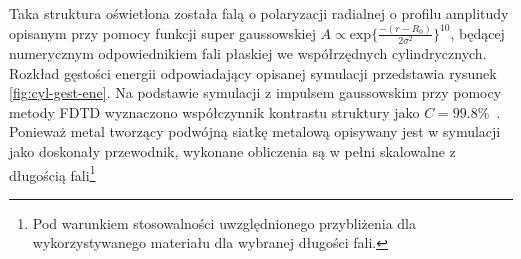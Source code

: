 Taka struktura oświetlona została falą o polaryzacji radialnej o profilu amplitudy opisanym przy pomocy funkcji super gaussowskiej $A \propto \textrm{exp}\{\frac{-(r-R_0)}{2\sigma^2}\}^{10}$, będącej numerycznym odpowiednikiem fali płaskiej we współrzędnych cylindrycznych. Rozkład gęstości energii odpowiadający opisanej symulacji przedstawia rysunek \ref{fig:cyl-gest-ene}. Na podstawie symulacji z impulsem gaussowskim przy pomocy metody FDTD wyznaczono współczynnik kontrastu struktury jako $C=99.8\%$~\cite{Yavorskiy:14}. Ponieważ metal tworzący podwójną siatkę metalową opisywany jest w symulacji jako doskonały przewodnik, wykonane obliczenia są w pełni skalowalne z długością fali\footnote{Pod warunkiem stosowalności uwzględnionego przybliżenia dla wykorzystywanego materiału dla wybranej długości fali.}


